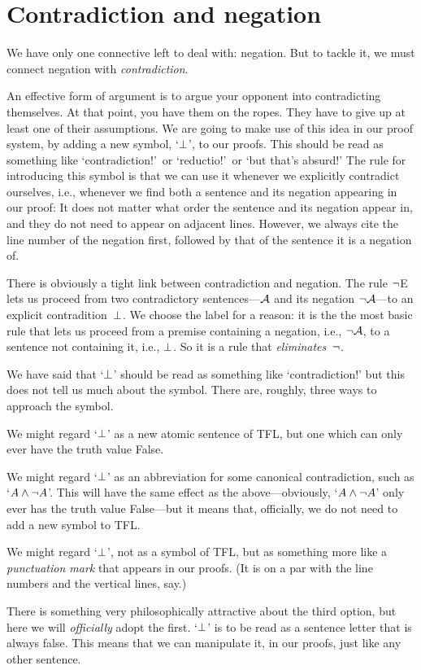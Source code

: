 \section{Contradiction and negation}

We have only one connective left to deal with: negation. But to tackle it, we must connect negation with \emph{contradiction}. 

An effective form of argument is to argue your opponent into contradicting themselves. At that point, you have them on the ropes. They have to give up at least one of their assumptions. We are going to make use of this idea in our proof system, by adding a new symbol, `$\bot$', to our proofs. This should be read as something like `contradiction!'\ or `reductio!'\ or `but that's absurd!'  The rule for introducing this symbol is that we can use it whenever we explicitly contradict ourselves, i.e., whenever we find both a sentence and its negation appearing in our proof:
It does not matter what order the sentence and its negation appear in, and they do not need to appear on adjacent lines. However, we always cite the line number of the negation first, followed by that of the sentence it is a negation of.

There is obviously a tight link between contradiction and negation. 
The rule $\neg$E lets us proceed from two contradictory sentences---$\mathcal{A}$ and its negation $\neg \mathcal{A}$---to an explicit contradition~$\bot$. We choose the label for a reason: it is the the most basic rule that lets us proceed from a premise containing a negation, i.e., $\neg\mathcal{A}$, to a sentence not containing it, i.e., $\bot$. So it is a rule that \emph{eliminates}~$\neg$.

We have said that `$\bot$' should be read as something like `contradiction!' but this does not tell us much about the symbol. There are, roughly, three ways to approach the symbol. 
	\begin{ebullet}
		\item We might regard `$\bot$' as a new atomic sentence of TFL, but one which can only ever have the truth value False. 
		\item We might regard `$\bot$' as an abbreviation for some canonical contradiction, such as `$A \wedge \neg A$'. This will have the same effect as the above---obviously, `$A \wedge \neg A$' only ever has the truth value False---but it means that, officially, we do not need to add a new symbol to TFL.
		\item We might regard `$\bot$', not as a symbol of TFL, but as something more like a \emph{punctuation mark} that appears in our proofs. (It is on a par with the line numbers and the vertical lines, say.)
	\end{ebullet}
There is something very philosophically attractive about the third option, but here we will \emph{officially} adopt the first. `$\bot$' is to be read as a sentence letter that is always false. This means that we can manipulate it, in our proofs, just like any other sentence.

